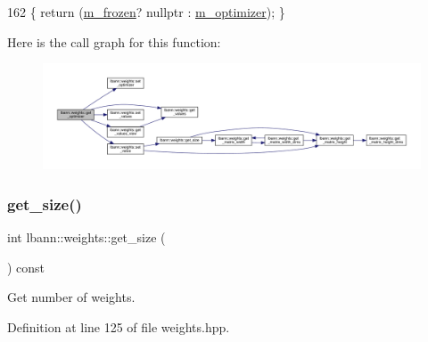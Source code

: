 \begin{DoxyCode}
162 \{ \textcolor{keywordflow}{return} (\hyperlink{classlbann_1_1weights_a3962305112ba98ef2eb89c6f7035f6dd}{m\_frozen}? \textcolor{keyword}{nullptr} : \hyperlink{classlbann_1_1weights_a5f3b4d4a3ad390c2a9bdbe6c4971de65}{m\_optimizer}); \}
\end{DoxyCode}
Here is the call graph for this function\+:\nopagebreak
\begin{figure}[H]
\begin{center}
\leavevmode
\includegraphics[width=350pt]{classlbann_1_1weights_a5754ec6534e1b47e2363c2848649f8a2_cgraph}
\end{center}
\end{figure}
\mbox{\label{classlbann_1_1weights_a3216926df0aaf7aa440b9e5317d05fa2}} 
\subsubsection{\texorpdfstring{get\+\_\+size()}{get\_size()}}
{\footnotesize\ttfamily int lbann\+::weights\+::get\+\_\+size (\begin{DoxyParamCaption}{ }\end{DoxyParamCaption}) const\hspace{0.3cm}{\ttfamily [inline]}}

Get number of weights. 

Definition at line 125 of file weights.\+hpp.


